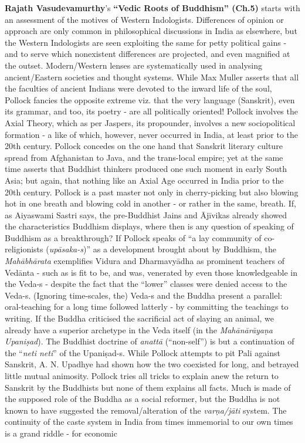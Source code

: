 \textbf{Rajath Vasudevamurthy}’s \textbf{“Vedic Roots of Buddhism” (Ch.5)} starts with an assessment of the motives of Western Indologists. Differences of opinion or approach are only common in philosophical discussions in India as elsewhere, but the Western Indologists are seen exploiting the same for petty political gains - and to serve which nonexistent differences are projected, and even magnified at the outset. Modern/Western lenses are systematically used in analysing ancient/Eastern societies and thought systems. While Max Muller asserts that all the faculties of ancient Indians were devoted to the inward life of the soul, Pollock fancies the opposite extreme viz. that the very language (Sanskrit), even its grammar, and too, its poetry - are all politically oriented! Pollock involves the Axial Theory, which as per Jaspers, its propounder, involves a new sociopolitical formation - a like of which, however, never occurred in India, at least prior to the 20th century. Pollock concedes on the one hand that Sanskrit literary culture spread from Afghanistan to Java, and the trans-local empire; yet at the same time asserts that Buddhist thinkers produced one such moment in early South Asia; but again, that nothing like an Axial Age occurred in India prior to the 20th century. Pollock is a past master not only in cherry-picking but also blowing hot in one breath and blowing cold in another - or rather in the same, breath. If, as Aiyaswami Sastri says, the pre-Buddhist Jains and Ājīvikas already showed the characteristics Buddhism displays, where then is any question of speaking of Buddhism as a breakthrough? If Pollock speaks of “a lay community of co-religionists (\textit{upāsaka-s})” as a development brought about by Buddhism, the \textit{Mahābhārata} exemplifies Vidura and Dharmavyādha as prominent teachers of Vedānta - such as is fit to be, and was, venerated by even those knowledgeable in the Veda-s - despite the fact that the “lower” classes were denied access to the Veda-s. (Ignoring time-scales, the) Veda-s and the Buddha present a parallel: oral-teaching for a long time followed latterly - by committing the teachings to writing. If the Buddha criticised the sacrificial act of slaying an animal, we already have a superior archetype in the Veda itself (in the \textit{Mahānārāyaṇa Upaniṣad}). The Buddhist doctrine of \textit{anattā} (“non-self”) is but a continuation of the “\textit{neti neti}” of the Upaniṣad-s. While Pollock attempts to pit Pali against Sanskrit, A. N. Upadhye had shown how the two coexisted for long, and betrayed little mutual animosity. Pollock tries all tricks to explain anew the return to Sanskrit by the Buddhists but none of them explains all facts. Much is made of the supposed role of the Buddha as a social reformer, but the Buddha is not known to have suggested the removal/alteration of the \textit{varṇa/jāti} system. The continuity of the caste system in India from times immemorial to our own times is a grand riddle - for economic 
